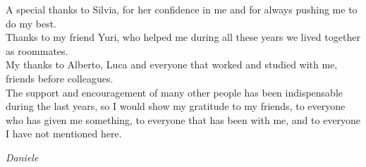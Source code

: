 A special thanks to Silvia, for her confidence in me and for always pushing me to do my best.\\

Thanks to my friend Yuri, who helped me during all these years we lived together as roommates.\\

My thanks to Alberto, Luca and everyone that worked and studied with me, friends before colleagues.\\

The support and encouragement of many other people has been indispensable during the last years, so I would show my gratitude to my friends, to everyone who has given me something, to everyone that has been with me, and to everyone I have not mentioned here.\\

\begin{flushright}
\textit{Daniele}
\end{flushright}

 

